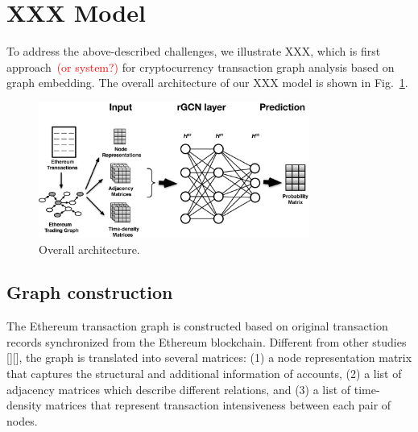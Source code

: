 
\section{XXX Model}
\label{sec:model}
To address the above-described challenges, we illustrate XXX, which is first approach~\textcolor{red}{(or system?)} for cryptocurrency transaction graph analysis based on graph embedding. The overall architecture of our XXX model is shown in Fig.~\ref{fig:architecture}. 

\begin{figure}[htbp]
	\centering
	\includegraphics[width=3.5in]{fig/architecture.eps}
	\caption{Overall architecture.}
	\label{fig:architecture}
\end{figure}


\subsection{Graph construction}
\label{sec:input}
The Ethereum transaction graph is constructed based on original transaction records synchronized from the Ethereum blockchain. Different from other studies [][], the graph is translated into several matrices: (1) a node representation matrix that captures the structural and additional information of accounts, (2) a list of adjacency matrices which describe different relations, and (3) a list of time-density matrices that represent transaction intensiveness between each pair of nodes.

